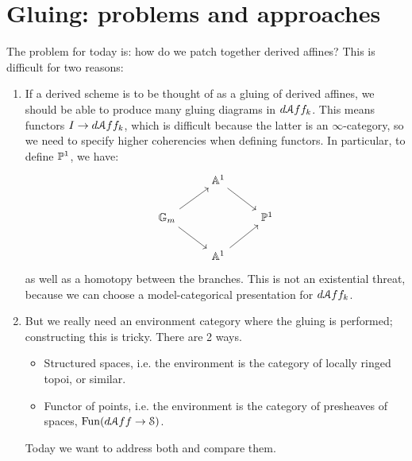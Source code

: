 \documentclass[10pt,a4paper,reqno,oneside]{book} %
\theoremstyle{plain}
\theoremstyle{definition}
\theoremstyle{remark}
\numberwithin{equation}{section}
\begin{document}
\section{Gluing: problems and approaches}
The problem for today is: how do we patch together derived affines? This is difficult for two reasons:
\begin{enumerate}
\item If a derived scheme is to be thought of as a gluing of derived affines, we should be able to produce many gluing
diagrams in $d \mathcal A ff_k$. This means functors $I \to d \mathcal A ff_k$, which is difficult because the latter is an $\infty$-category,
so we need to specify higher coherencies when defining functors.
In particular, to define $\mathbb P^1$, we have:
\[
\begin{tikzcd}
\; & \bbA^1\arrow{dr} &  \\
\bbG_m \arrow{ur}\arrow{dr} & & \bbP^1 \\
& \bbA^1\arrow{ur} &
\end{tikzcd}
\] 
as well as a homotopy between the branches. 
This is not an existential threat, because we can choose a model-categorical presentation for $d \mathcal A ff_k$.
\item But we really need an environment category where the gluing is performed; constructing this is tricky. There are 2 ways.
\begin{itemize}
\item Structured spaces, i.e. the environment is the category of locally ringed topoi, or similar.
\item Functor of points, i.e. the environment is the category of presheaves of spaces, $\operatorname{Fun}(d\mathcal A ff \to \mathcal S)$.
\end{itemize}
Today we want to address both and compare them.
\end{enumerate}
\end{document}
